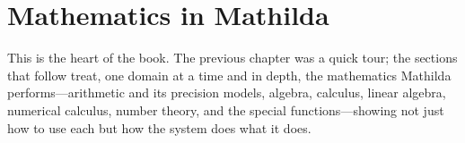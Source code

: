 \chapter{Mathematics in Mathilda}
\label{ch:mathematics}

This is the heart of the book. The previous chapter was a quick tour; the sections
that follow treat, one domain at a time and in depth, the mathematics Mathilda
performs---arithmetic and its precision models, algebra, calculus, linear algebra,
numerical calculus, number theory, and the special functions---showing not just how
to use each but how the system does what it does.








